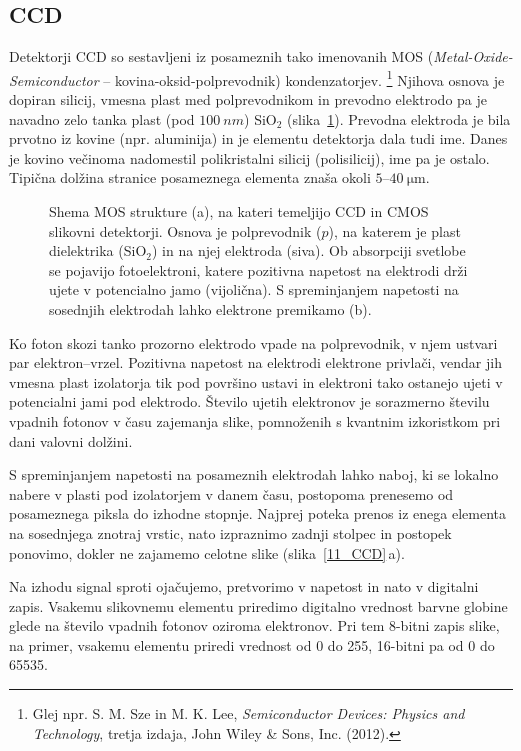 \subsection*{CCD}
Detektorji CCD so sestavljeni iz posameznih tako imenovanih MOS 
({\it Metal-Oxide-Semiconductor}
-- kovina-oksid-polprevodnik) kondenzatorjev. \footnote{Glej npr. 
S. M. Sze in M. K. Lee, {\it Semiconductor Devices: Physics and Technology}, 
tretja izdaja, John Wiley \& Sons, Inc. (2012).}
Njihova osnova je dopiran silicij, vmesna 
plast med polprevodnikom in prevodno elektrodo pa je navadno zelo tanka plast (pod $100~\si{nm}$)
SiO$_2$ (slika~\ref{11_MOS}).
Prevodna elektroda je bila prvotno iz kovine (npr. aluminija) in je elementu detektorja dala tudi ime.
Danes je kovino večinoma nadomestil polikristalni silicij (polisilicij), ime pa je ostalo.
Tipična dolžina stranice posameznega elementa znaša okoli $5$--$40~\si{\micro\meter}$. 
\begin{figure}[h!]
\centering
\def\svgwidth{140truemm} 

\caption{Shema MOS strukture (a), na kateri temeljijo CCD in CMOS slikovni detektorji. Osnova je 
polprevodnik ($p$), na katerem je plast dielektrika (SiO$_2$) in na njej elektroda (siva). 
Ob absorpciji svetlobe se pojavijo fotoelektroni, katere pozitivna napetost
na elektrodi drži ujete v potencialno jamo (vijolična). S spreminjanjem napetosti
na sosednjih elektrodah lahko elektrone premikamo (b).}
\label{11_MOS}
\end{figure}

Ko foton skozi tanko prozorno elektrodo vpade na polprevodnik, v njem ustvari
par elektron--vrzel. Pozitivna napetost na elektrodi elektrone privlači, vendar jih 
vmesna plast izolatorja tik pod površino ustavi in elektroni tako ostanejo ujeti v potencialni jami
pod elektrodo. Število ujetih elektronov je sorazmerno številu vpadnih fotonov v času zajemanja slike, 
pomnoženih s kvantnim izkoristkom pri dani valovni dolžini. 

S spreminjanjem napetosti na posameznih elektrodah lahko naboj, ki se lokalno nabere 
v plasti pod izolatorjem v danem času, postopoma prenesemo od posameznega 
piksla do izhodne stopnje. Najprej poteka prenos iz enega elementa na sosednjega znotraj vrstic, 
nato izpraznimo zadnji stolpec in postopek ponovimo, dokler ne zajamemo celotne slike 
(slika~\ref{11_CCD}\,a). 

Na izhodu signal sproti ojačujemo, 
pretvorimo v napetost in nato  v digitalni zapis. Vsakemu slikovnemu elementu priredimo
digitalno vrednost barvne globine glede na število vpadnih fotonov oziroma elektronov. Pri tem
8-bitni zapis slike, na primer, vsakemu elementu priredi vrednost od 0 do 255, 16-bitni pa od 0 do 65535.

